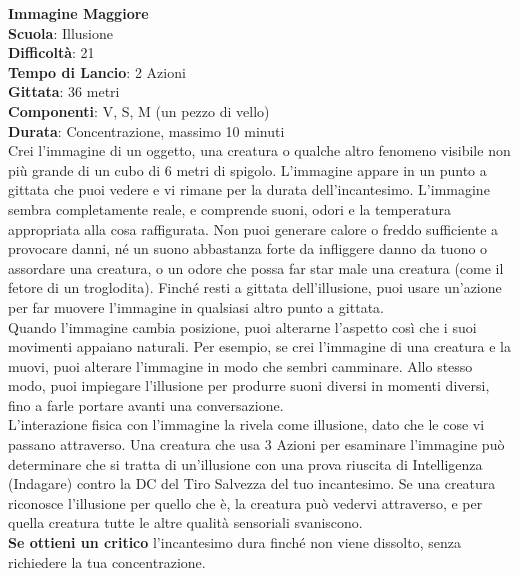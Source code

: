\begin{multicols}{2}
\medskip\textbf{Immagine Maggiore}\\
\textbf{Scuola}: Illusione\\
\textbf{Difficoltà}: 21\\
\textbf{Tempo di Lancio}: 2 Azioni\\
\textbf{Gittata}: 36 metri\\
\textbf{Componenti}: V, S, M (un pezzo di vello)\\
\textbf{Durata}: Concentrazione, massimo 10 minuti\\
Crei l'immagine di un oggetto, una creatura o qualche altro fenomeno visibile non più grande di un cubo di 6 metri di spigolo. L'immagine appare in un punto a gittata che puoi vedere e vi rimane per la durata dell'incantesimo. L'immagine sembra completamente reale, e comprende suoni, odori e la temperatura appropriata alla cosa raffigurata. Non puoi generare calore o freddo sufficiente a provocare danni, né un suono abbastanza forte da infliggere danno da tuono o assordare una creatura, o un odore che possa far star male una creatura (come il fetore di un troglodita). Finché resti a gittata dell'illusione, puoi usare un'azione per far muovere l'immagine in qualsiasi altro punto a gittata.\\
Quando l'immagine cambia posizione, puoi alterarne l'aspetto così che i suoi movimenti appaiano naturali. Per esempio, se crei l'immagine di una creatura e la muovi, puoi alterare l'immagine in modo che sembri camminare. Allo stesso modo, puoi impiegare l'illusione per produrre suoni diversi in momenti diversi, fino a farle portare avanti una conversazione.\\
L'interazione fisica con l'immagine la rivela come illusione, dato che le cose vi passano attraverso. Una creatura che usa 3 Azioni per esaminare l'immagine può determinare che si tratta di un'illusione con una prova riuscita di Intelligenza (Indagare) contro la DC del Tiro Salvezza del tuo incantesimo. Se una creatura riconosce l'illusione per quello che è, la creatura può vedervi attraverso, e per quella creatura tutte le altre qualità sensoriali svaniscono.\\
\textbf{Se ottieni un critico} l'incantesimo dura finché non viene dissolto, senza richiedere la tua concentrazione.
	

\end{multicols}
